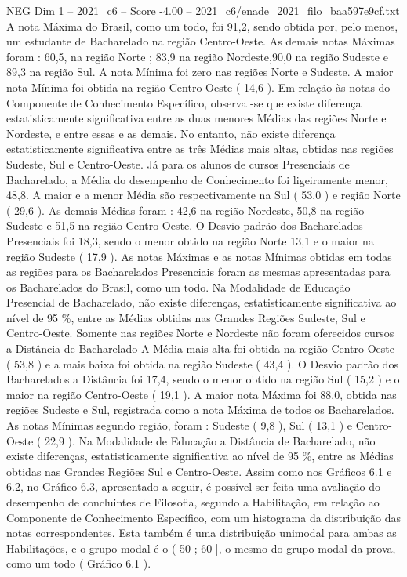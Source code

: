 \begin{textsample}{NEG Dim 1 – 2021\_c6 – Score -4.00 – 2021\_c6/enade\_2021\_filo\_baa597e9cf.txt}
A nota Máxima do Brasil, como um todo, foi 91,2, sendo obtida por, pelo menos, um estudante de Bacharelado na região Centro-Oeste.
As demais notas Máximas foram : 60,5, na região Norte ; 83,9 na região Nordeste,90,0 na região Sudeste e 89,3 na região Sul.
A nota Mínima foi zero nas regiões Norte e Sudeste.
A maior nota Mínima foi obtida na região Centro-Oeste ( 14,6 ).
Em relação às notas do Componente de Conhecimento Específico, observa -se que existe diferença estatisticamente significativa entre as duas menores Médias das regiões Norte e Nordeste, e entre essas e as demais.
No entanto, não existe diferença estatisticamente significativa entre as três Médias mais altas, obtidas nas regiões Sudeste, Sul e Centro-Oeste.
Já para os alunos de cursos Presenciais de Bacharelado, a Média do desempenho de Conhecimento foi ligeiramente menor, 48,8.
A maior e a menor Média são respectivamente na Sul ( 53,0 ) e região Norte ( 29,6 ).
As demais Médias foram : 42,6 na região Nordeste, 50,8 na região Sudeste e 51,5 na região Centro-Oeste.
O Desvio padrão dos Bacharelados Presenciais foi 18,3, sendo o menor obtido na região Norte 13,1 e o maior na região Sudeste ( 17,9 ).
As notas Máximas e as notas Mínimas obtidas em todas as regiões para os Bacharelados Presenciais foram as mesmas apresentadas para os Bacharelados do Brasil, como um todo.
Na Modalidade de Educação Presencial de Bacharelado, não existe diferenças, estatisticamente significativa ao nível de 95 \%, entre as Médias obtidas nas Grandes Regiões Sudeste, Sul e Centro-Oeste.
Somente nas regiões Norte e Nordeste não foram oferecidos cursos a Distância de Bacharelado A Média mais alta foi obtida na região Centro-Oeste ( 53,8 ) e a mais baixa foi obtida na região Sudeste ( 43,4 ).
O Desvio padrão dos Bacharelados a Distância foi 17,4, sendo o menor obtido na região Sul ( 15,2 ) e o maior na região Centro-Oeste ( 19,1 ).
A maior nota Máxima foi 88,0, obtida nas regiões Sudeste e Sul, registrada como a nota Máxima de todos os Bacharelados.
As notas Mínimas segundo região, foram : Sudeste ( 9,8 ), Sul ( 13,1 ) e Centro-Oeste ( 22,9 ).
Na Modalidade de Educação a Distância de Bacharelado, não existe diferenças, estatisticamente significativa ao nível de 95 \%, entre as Médias obtidas nas Grandes Regiões Sul e Centro-Oeste.
Assim como nos Gráficos 6.1 e 6.2, no Gráfico 6.3, apresentado a seguir, é possível ser feita uma avaliação do desempenho de concluintes de Filosofia, segundo a Habilitação, em relação ao Componente de Conhecimento Específico, com um histograma da distribuição das notas correspondentes.
Esta também é uma distribuição unimodal para ambas as Habilitações, e o grupo modal é o ( 50 ; 60 ], o mesmo do grupo modal da prova, como um todo ( Gráfico 6.1 ).

\end{textsample}
